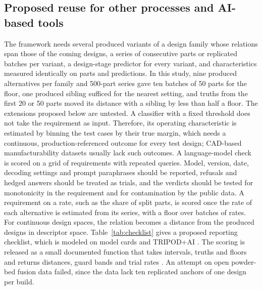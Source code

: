\documentclass[pdflatex,sn-basic,lineno]{sn-jnl}
\begin{document}
\subsection{Proposed reuse for other processes and AI-based tools}\label{sec:reuse}

The framework needs several produced variants of a design family whose relations span those of the coming designs, a series of consecutive parts or replicated batches per variant, a design-stage predictor for every variant, and characteristics measured identically on parts and predictions. In this study, nine produced alternatives per family and 500-part series gave ten batches of 50 parts for the floor, one produced sibling sufficed for the nearest setting, and truths from the first 20 or 50 parts moved its distance with a sibling by less than half a floor. The extensions proposed below are untested. A classifier with a fixed threshold does not take the requirement as input. Therefore, its operating characteristic is estimated by binning the test cases by their true margin, which needs a continuous, production-referenced outcome for every test design; CAD-based manufacturability datasets usually lack such outcomes. A language-model check is scored on a grid of requirements with repeated queries. Model, version, date, decoding settings and prompt paraphrases should be reported, refusals and hedged answers should be treated as trials, and the verdicts should be tested for monotonicity in the requirement and for contamination by the public data. A requirement on a rate, such as the share of split parts, is scored once the rate of each alternative is estimated from its series, with a floor over batches of rates. For continuous design spaces, the relation becomes a distance from the produced designs in descriptor space. Table~\ref{tab:checklist} gives a proposed reporting checklist, which is modeled on model cards \citep{mitchell2019model} and TRIPOD+AI \citep{collins2024tripod}. The scoring is released as a small documented function that takes intervals, truths and floors and returns distances, guard bands and trial rates \citep{canseven2026archive}. An attempt on open powder-bed fusion data \citep{leirmo2021data} failed, since the data lack ten replicated anchors of one design per build.
\end{document}
